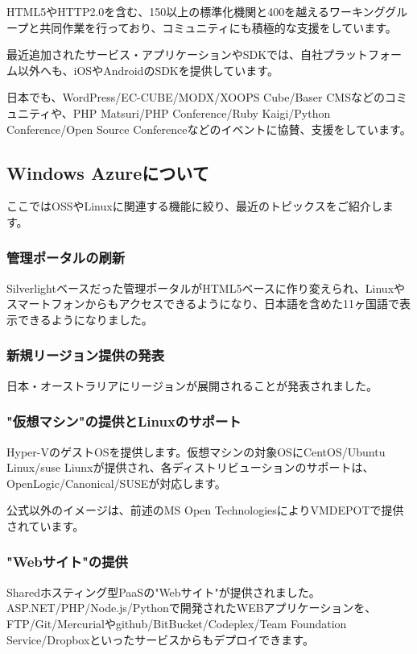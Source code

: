 \documentclass[mingoth,a4paper,twoside]{jsarticle}
\begin{document}
HTML5やHTTP2.0を含む、150以上の標準化機関と400を越えるワーキンググループと共同作業を行っており、コミュニティにも積極的な支援をしています。

最近追加されたサービス・アプリケーションやSDKでは、自社プラットフォーム以外へも、iOSやAndroidのSDKを提供しています。

日本でも、WordPress/EC-CUBE/MODX/XOOPS Cube/Baser CMSなどのコミュニティや、PHP Matsuri/PHP Conference/Ruby Kaigi/Python Conference/Open Source Conferenceなどのイベントに協賛、支援をしています。

\subsection{Windows Azureについて}

ここではOSSやLinuxに関連する機能に絞り、最近のトピックスをご紹介します。


\subsubsection{管理ポータルの刷新}

Silverlightベースだった管理ポータルがHTML5ベースに作り変えられ、Linuxやスマートフォンからもアクセスできるようになり、日本語を含めた11ヶ国語で表示できるようになりました。

\subsubsection{新規リージョン提供の発表}

日本・オーストラリアにリージョンが展開されることが発表されました。

\subsubsection{"仮想マシン"の提供とLinuxのサポート}

Hyper-VのゲストOSを提供します。仮想マシンの対象OSにCentOS/Ubuntu Linux/suse Liunxが提供され、各ディストリビューションのサポートは、OpenLogic/Canonical/SUSEが対応します。

公式以外のイメージは、前述のMS Open TechnologiesによりVMDEPOTで提供されています。

\subsubsection{"Webサイト"の提供}

Sharedホスティング型PaaSの"Webサイト"が提供されました。ASP.NET/PHP/Node.js/Pythonで開発されたWEBアプリケーションを、FTP/Git/Mercurialやgithub/BitBucket/Codeplex/Team Foundation Service/Dropboxといったサービスからもデプロイできます。
\end{document}
